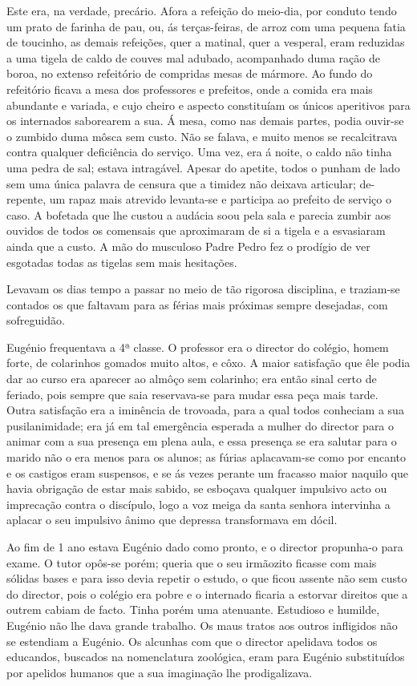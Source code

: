 \documentclass[9pt]{article}
\begin{document}
Este era, na verdade, precário. Afora a refei\-ção do meio-dia, por conduto tendo
um prato de farinha de pau, ou, ás terças-feiras, de arroz com
uma pequena fatia de toucinho, as demais refei\-ções, quer a matinal, quer
a vesperal, eram reduzidas a uma tigela de caldo de couves mal adubado,
acompanhado duma ra\-ção de boroa, no extenso refeitório de compridas mesas
de mármore. Ao fundo do refeitório fi\-cava a mesa dos professores e prefeitos, onde a comida era mais abundante e variada, e cujo cheiro e aspecto
constituíam os únicos aperitivos para os internados saborearem a sua. Á mesa,
como nas demais partes, podia ouvir-se o zumbido duma môsca sem custo.
Não se falava, e muito menos se recalcitrava contra qualquer deficiência
do serviço. Uma vez, era á noite, o caldo não tinha uma pedra de sal; estava intragável. Apesar do apetite, todos o punham de lado sem uma única
palavra de censura que a timidez não deixava articular; de-repente, um
rapaz mais atrevido levanta-se e participa ao prefeito de serviço o caso.
A bofetada que lhe custou a audácia soou pela sala e parecia zumbir aos
ouvidos de todos os comensais que a\-pro\-xi\-maram de si a tigela e a esvasiaram ainda que a custo. A mão do musculoso Padre Pedro fez o prodígio
de ver esgotadas todas as tigelas sem mais hesita\-ções.

\fotoE

Levavam os dias tempo a passar no meio de tão rigorosa disciplina, e
traziam-se contados os que faltavam para as férias mais próximas sempre
desejadas, com sofreguidão.

Eugé\-nio frequentava a 4ª classe. O professor era o director do colé\-gio, homem forte, de colarinhos gomados muito altos, e côxo. A maior satisfa\-ção que êle podia dar ao curso era aparecer ao almôço sem colarinho;
era então sinal certo de feriado, pois sempre que saia reservava-se para
mudar essa peça mais tarde. Outra satisfa\-ção era a iminência de trovoada,
para a qual todos conheciam a sua pusilanimidade; era já em tal emergência esperada a mu\-lher do director para o animar com a sua presença em
plena aula, e essa presença se era salutar para o marido não o era menos
para os alunos; as fúrias aplacavam-se como por encanto e os castigos
eram suspensos, e se ás vezes perante um fracasso maior naquilo que havia
obriga\-ção de estar mais sabido, se esboçava qualquer impulsivo acto ou
impreca\-ção contra o discípulo, logo a voz meiga da santa senhora intervinha a aplacar o seu impulsivo ânimo que depressa transformava em dócil.

Ao fim de 1 ano estava Eugé\-nio dado como pronto, e o director propunha-o para exame. O tutor opôs-se porém; queria que o seu irmãozito fi\-casse com mais sólidas bases e para isso devia repetir o estudo, o que
ficou assente não sem custo do director, pois o colégio era pobre e o internado fi\-caria a estorvar direitos que a outrem cabiam de facto. Tinha
porém uma atenuante. Estudioso e humilde, Eugé\-nio não lhe dava gran\-de traba\-lho. Os maus tratos aos outros infligidos não se estendiam a Eugé\-nio.
Os alcunhas com que o director apelidava todos os educandos, buscados na
nomenclatura zoológica, eram para Eugé\-nio substituídos por apelidos humanos que a sua imagina\-ção lhe prodigalizava.
\end{document}
